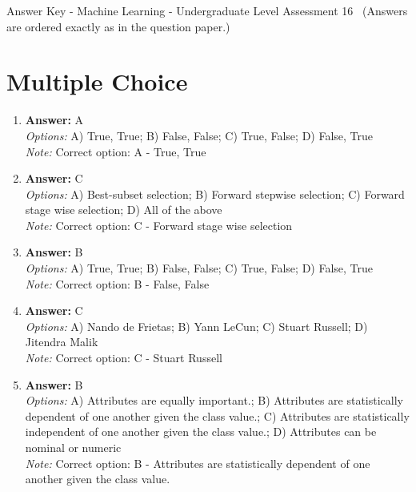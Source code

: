 \documentclass[12pt]{article}
\begin{document}
\begin{center}
Answer Key - Machine Learning - Undergraduate Level Assessment 16 \
\small (Answers are ordered exactly as in the question paper.)
\end{center}

\section*{Multiple Choice}
\begin{enumerate}[label=\arabic*.]
\item \textbf{Answer:} A
\\ \textit{Options:} A) True, True; B) False, False; C) True, False; D) False, True
\\ \textit{Note:} Correct option: A - True, True
\item \textbf{Answer:} C
\\ \textit{Options:} A) Best-subset selection; B) Forward stepwise selection; C) Forward stage wise selection; D) All of the above
\\ \textit{Note:} Correct option: C - Forward stage wise selection
\item \textbf{Answer:} B
\\ \textit{Options:} A) True, True; B) False, False; C) True, False; D) False, True
\\ \textit{Note:} Correct option: B - False, False
\item \textbf{Answer:} C
\\ \textit{Options:} A) Nando de Frietas; B) Yann LeCun; C) Stuart Russell; D) Jitendra Malik
\\ \textit{Note:} Correct option: C - Stuart Russell
\item \textbf{Answer:} B
\\ \textit{Options:} A) Attributes are equally important.; B) Attributes are statistically dependent of one another given the class value.; C) Attributes are statistically independent of one another given the class value.; D) Attributes can be nominal or numeric
\\ \textit{Note:} Correct option: B - Attributes are statistically dependent of one another given the class value.
\end{enumerate}
\end{document}
